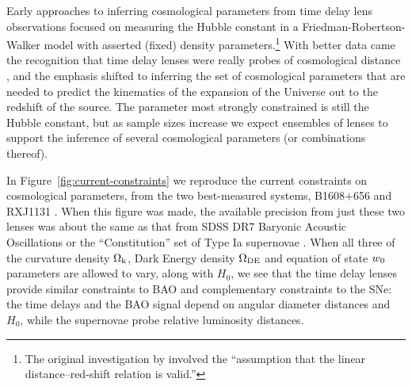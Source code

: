 Early approaches to inferring cosmological parameters from time delay
lens observations focused on measuring the Hubble constant in a
Friedman-Robertson-Walker model with asserted (fixed) density
parameters.\footnote{The original investigation by \citet{Ref64}
involved the ``assumption that the linear distance--red-shift relation
is valid.''} With better data came the recognition that time delay
lenses were really probes of cosmological distance
\citep{Koo++03,Suy++10}, and the emphasis shifted to
inferring the set of cosmological parameters that are needed to predict
the kinematics of the expansion of the Universe out to the redshift of
the source.
The parameter most strongly constrained is still the Hubble constant,
but as sample sizes increase we expect ensembles of lenses to support
the inference of several cosmological parameters (or combinations
thereof).

In Figure~\ref{fig:current-constraints} we reproduce the current
constraints on cosmological parameters, from the two best-measured
systems, B1608$+$656 and RXJ1131 \citep{Suy++14}. When this figure was
made, the available precision from just these two lenses was about the
same as that from SDSS DR7 Baryonic Acoustic Oscillations
\citep{PercivalEtal2010} or the ``Constitution'' set of Type Ia
supernovae \citep{HickenEtal2009}.  When all three of the curvature
density $\Omega_{\rm k}$, Dark Energy density $\Omega_{\rm DE}$ and equation of state $w_0$
parameters are allowed to vary, along with $H_0$, we see that the time
delay lenses provide similar constraints to BAO and complementary
constraints to the SNe: the time delays and the BAO signal depend on
angular diameter distances and $H_0$, while the supernovae probe
relative luminosity distances.

